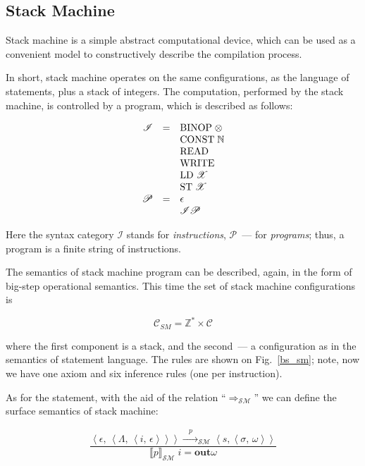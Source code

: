 \documentclass{article}
\def\transarrow{\xrightarrow}
\def\padding{\phantom{X}}
\def\subarrow{}
\newcommand{\setsubarrow}[1]{\def\subarrow{#1}}
\newcommand{\trule}[2]{\frac{#1}{#2}}
\newcommand{\trans}[3]{{#1}\transarrow{\padding{\textstyle #2}\padding}\subarrow{#3}}
\newcommand{\llang}[1]{\mbox{\lstinline[mathescape]|#1|}}
\newcommand{\inbr}[1]{\left<{#1}\right>}
\newcommand{\sembr}[1]{\llbracket{#1}\rrbracket}
\newcommand{\primi}[1]{\mathbf{#1}}
\begin{document}
\subsection{Stack Machine}

Stack machine is a simple abstract computational device, which can be used as a convenient model to constructively describe
the compilation process.

In short, stack machine operates on the same configurations, as the language of statements, plus a stack of integers. The
computation, performed by the stack machine, is controlled by a program, which is described as follows:

\[
\renewcommand{\arraystretch}{1}
\begin{array}{rcl}
  \mathscr I & = & \llang{BINOP $\;\otimes$} \\
             &   & \llang{CONST $\;\mathbb N$} \\
             &   & \llang{READ} \\
             &   & \llang{WRITE} \\
             &   & \llang{LD $\;\mathscr X$} \\
             &   & \llang{ST $\;\mathscr X$} \\
  \mathscr P & = & \epsilon \\
             &   & \mathscr I\mathscr P
\end{array}
\]

Here the syntax category $\mathscr I$ stands for \emph{instructions}, $\mathscr P$~--- for \emph{programs}; thus, a program is a finite
string of instructions.

The semantics of stack machine program can be described, again, in the form of big-step operational semantics. This time the set of
stack machine configurations is

\[
\mathscr C_{SM} = \mathbb Z^* \times \mathscr C
\]

where the first component is a stack, and the second~--- a configuration as in the semantics of statement language. The rules are shown on Fig.~\ref{bs_sm}; note,
now we have one axiom and six inference rules (one per instruction).

\setsubarrow{_{\mathscr{SM}}}

As for the statement, with the aid of the relation ``$\Rightarrow_{\mathscr{SM}}$'' we can define the surface semantics of stack machine:

\[
\trule{\trans{\inbr{\epsilon,\,\inbr{\Lambda,\,\inbr{i,\,\epsilon}}}}{p}{\inbr{s, \inbr{\sigma,\,\omega}}}}
      {\sembr{p}_{\mathscr{SM}}\;i=\primi{out}{\omega}}
\]
\end{document}
